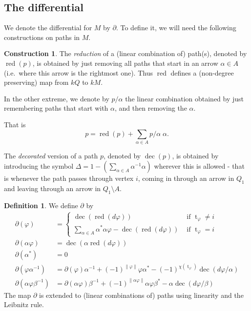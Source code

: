 \documentclass[a4paper,11pt]{amsart}
\theoremstyle{definition}
\newtheorem{construction}[theorem]{Construction}
\newtheorem{definition}[theorem]{Definition}
\DeclareMathOperator{\red}{red}
\DeclareMathOperator{\dec}{dec}
\newcommand{\ci}[1]{\chi(#1)}
\newcommand{\ta}[1]{\operatorname{t}_{#1}}
\numberwithin{theorem}{section}
\begin{document}
\subsection*{The differential}

We denote the differential for $M$ by $\partial$. To define it, we will need the following constructions on paths in $M$.

\begin{construction} \label{const.red_dec}
The \emph{reduction} of a (linear combination of) path(s), denoted by $\red(p)$, is obtained by just removing all paths that start in an arrow $\alpha \in A$ (i.e.\ where this arrow is the rightmost one). Thus $\red$ defines a (non-degree preserving) map from $kQ$ to $kM$.

In the other extreme, we denote by $p / \alpha$ the linear combination obtained by just remembering paths that start with $\alpha$, and then removing the $\alpha$.

That is
\[ p = \red(p) + \sum_{\alpha \in A} p/\alpha \; \alpha. \]

\medskip
The \emph{decorated} version of a path $p$, denoted by $\dec(p)$, is obtained by introducing the symbol $\Delta = 1 - (\sum_{\alpha \in A} \alpha^{-1} \alpha)$ wherever this is allowed - that is whenever the path passes through vertex $i$, coming in through an arrow in $Q_1$ and leaving through an arrow in $Q_1 \setminus A$.
\end{construction}

\begin{definition} \label{def.new_diff}
We define $\partial$ by
\begin{align*}
\partial(\varphi) & = \begin{cases} \dec( \red( d \varphi)) & \text{ if } \ta{\varphi} \neq i \\ \sum_{\alpha \in A} \alpha^* \alpha \varphi - \dec( \red( d \varphi)) & \text{ if } \ta{\varphi} = i \end{cases} \\
\partial(\alpha \varphi) & = \dec( \alpha \red ( d \varphi)) \\
\partial(\alpha^*) & = 0 \\
\partial( \varphi \alpha^{-1}) & = \partial(\varphi) \alpha^{-1} + (-1)^{\| \varphi \|} \varphi \alpha^*  - (-1)^{\ci{ \ta{\varphi}}} \dec( d\varphi / \alpha) \\
\partial(\alpha \varphi \beta^{-1}) & = \partial(\alpha \varphi) \beta^{-1} + (-1)^{\| \alpha \varphi \|} \alpha \varphi \beta^* - \alpha \dec( d \varphi / \beta )
\end{align*}
The map $\partial$ is extended to (linear combinations of) paths using linearity and the Leibnitz rule.
\end{definition}
\end{document}
